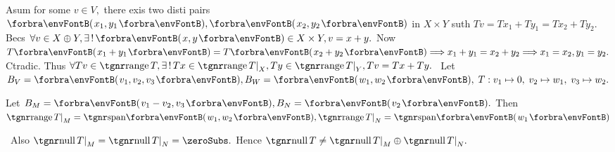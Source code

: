 Asum for some $v\in V,$ there exis two disti pairs $\Par{x_1,y_1},\Par{x_2,y_2}$ in $X\times Y$\parSol{}
suth $Tv=Tx_1+Ty_1=Tx_2+Ty_2.$ Becs $\forall v\in X\oplus Y,\exists\,!\,\Par{x,y}\in X\times Y,v=x+y.$\parSol{}
Now $T\Par{x_1+y_1}=T\Par{x_2+y_2}\Longrightarrow x_1+y_1=x_2+y_2\Longrightarrow x_1=x_2,y_1=y_2.$ Ctradic.\parSol{}
Thus $\forall Tv\in\range T,\exists\,!\,Tx\in\range T\mmid_X,Ty\in\range T\mmid_Y,Tv=Tx+Ty.$\PfEnd\vspace{2pt}
\Example\,\,\,Let $B_V=\Par{v_1,v_2,v_3},B_W=\Par{w_1,w_2},\;T:v_1\mapsto 0,\;v_2\mapsto w_1,\;v_3\mapsto w_2.$\par
\Blind{\Example \,\,\,}Let $B_M=\Par{v_1-v_2,v_3},B_N=\Par{v_2}.$ Then $\range T\mmid_M=\Span{w_1,w_2},\range T\mmid_N=\Span{w_1}$\par\vspace{2pt}
\Comment \,\,\,Also $\null T\mmid_M=\null T\mmid_N=\zeroSubs.$ Hence $\null T\neq\null T\mmid_M\oplus\null T\mmid_N.$
\SepLine

